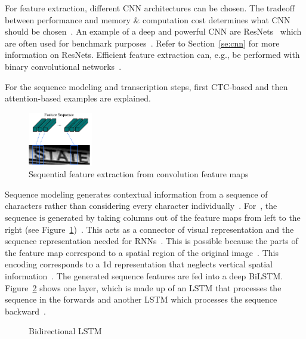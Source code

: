 For feature extraction, different \ac{CNN} architectures can be chosen.
The tradeoff between performance and memory \& computation cost determines what \ac{CNN} should be
chosen~\citep{chen_text_2021}.
An example of a deep and powerful \ac{CNN} are ResNets~\citep{he_deep_2015} which are often used
for benchmark purposes~\citep{chen_text_2021,long_scene_2021}.
Refer to Section~\ref{se:cnn} for more information on ResNets.
Efficient feature extraction can, e.g., be performed with binary convolutional
networks~\citep{liu_squeezedtext_2018}.

For the sequence modeling and transcription steps, first \ac{CTC}-based
and then attention-based examples are explained.
\begin{figure}[hb]
    \centering
    \includegraphics[width=0.25\textwidth]{img/STR-encdec-sequence-feat.png}
    \caption[Sequential feature extraction from convolution feature maps]{%
        Sequential feature extraction from convolution feature
        maps~\citep{shi_end--end_2017}\label{fig:STR-CTC-seq-feat}
    }
\end{figure}
Sequence modeling generates contextual information from a sequence of characters rather
than considering every character individually~\citep{chen_text_2021}.
For~\cite{shi_end--end_2017}, the sequence is generated by taking columns out of the feature maps
from left to the right (see Figure~\ref{fig:STR-CTC-seq-feat})~\citep{shi_end--end_2017}.
This acts as a connector of visual representation and the sequence representation
needed for \acp{RNN}~\citep{chen_text_2021}.
This is possible because the parts of the feature map correspond to a spatial region of the
original image~\citep{shi_end--end_2017,goodfellow_deep_2016}.
This encoding corresponds to a 1d representation that neglects vertical spatial
information~\citep{cong_comparative_2019}.
The generated sequence features are fed into a deep \ac{BiLSTM}.
Figure~\ref{fig:bilstm} shows one layer, which is made up of an \ac{LSTM} that processes the
sequence in the forwards and another \ac{LSTM} which processes the sequence
backward~\citep{shi_end--end_2017}.
\begin{figure}[ht]
    \centering
    \caption[Bidirectional LSTM]{%
        Bidirectional LSTM~\citep{goodfellow_deep_2016}\label{fig:bilstm}
    }
\end{figure}
